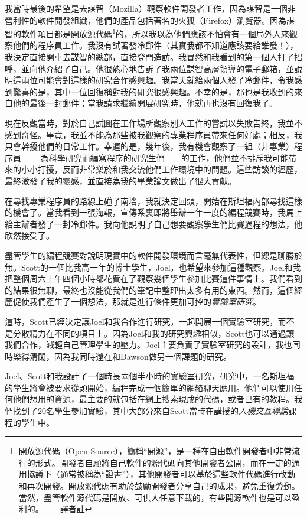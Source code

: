 \documentclass[12pt,UTF8,nofonts]{book}
\begin{document}
我當時最後的希望是去謀智（Mozilla）觀察軟件開發者工作，因為謀智是一個非營利性的軟件開發組織，他們的產品包括著名的火狐（Firefox）瀏覽器。因為謀智的軟件項目都是開放源代碼\footnote{開放源代碼（Open Source），簡稱“開源”，是一種在自由軟件開發者中非常流行的形式。開發者自願將自己軟件的源代碼向其他開發者公開，而在一定的通用協議下（通常被稱為“證書”），其他開發者可以基於這些軟件代碼進行改動和再次開發。開放源代碼有助於鼓勵開發者分享自己的成果，避免重復勞動。當然，盡管軟件源代碼是開放、可供人任意下載的，有些開源軟件也是可以盈利的。——譯者註}的，所以我以為他們應該不怕會有一個局外人來觀察他們的程序員工作。我沒有試著發冷郵件（其實我都不知道應該要給誰發！），我決定直接開車去謀智的總部，直接登門造訪。我冒然和我看到的第一個人打了招呼，並向他介紹了自己。他很熱心地告訴了我兩位謀智高層領導的電子郵箱，並說明這兩位可能會對這樣的研究合作感興趣。我當天就給兩個人發了冷郵件，令我感到驚喜的是，其中一位回復稱對我的研究很感興趣。不幸的是，那也是我收到的來自他的最後一封郵件；當我請求繼續開展研究時，他就再也沒有回復我了。

現在反觀當時，對於自己試圖在工作場所觀察別人工作的嘗試以失敗告終，我並不感到奇怪。畢竟，我並不能為那些被我觀察的專業程序員帶來任何好處；相反，我只會幹擾他們的日常工作。幸運的是，幾年後，我有機會觀察了一組（非專業）程序員—— 為科學研究而編寫程序的研究生們——的工作，他們並不排斥我可能帶來的小小打擾，反而非常樂於和我交流他們工作環境中的問題。這些訪談的經歷，最終激發了我的靈感，並直接為我的畢業論文做出了很大貢獻。

\breakline

在尋找專業程序員的路線上碰了南墻，我就決定回頭，開始在斯坦福內部尋找這樣的機會了。當我看到一張海報，宣傳系裏即將舉辦一年一度的編程競賽時，我馬上給主辦者發了一封冷郵件。我向他說明了自己想要觀察學生們比賽過程的想法，他欣然接受了。

盡管學生的編程競賽對說明現實中的軟件開發環境而言毫無代表性，但總是聊勝於無。Scott的一個比我高一年的博士學生，Joel，也希望來參加這種觀察。Joel和我把整個周六上午四個小時都花費在了觀察幾個學生參加比賽這件事情上。我們看到的結果很無聊，最終也沒能從我們的筆記中整理出太多有用的東西。然而，這個經歷促使我們產生了一個想法，那就是進行條件更加可控的\emph{實驗室研究}。

這時，Scott已經決定讓Joel和我合作進行研究，一起開展一個實驗室研究，而不是分散精力在不同的項目上。因為Joel和我的研究興趣相似，Scott也可以通過讓我們合作，減輕自己管理學生的壓力。Joel主要負責了實驗室研究的設計，我也同時樂得清閑，因為我同時還在和Dawson做另一個課題的研究。

Joel、Scott和我設計了一個時長兩個半小時的實驗室研究，研究中，一名斯坦福的學生將會被要求從頭開始，編程完成一個簡單的網絡聊天應用。他們可以使用任何他們想用的資源，最主要的就包括在網上搜索現成的代碼，或者已有的教程。我們找到了20名學生參加實驗，其中大部分來自Scott當時在講授的\emph{人機交互導論}課程的學生中。
\end{document}
